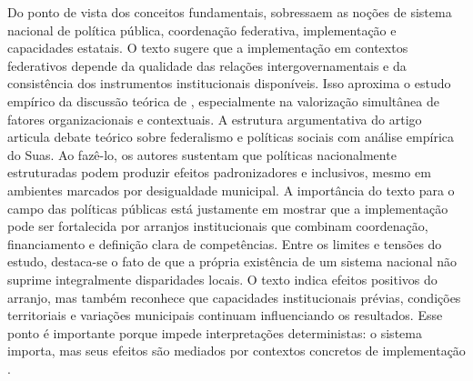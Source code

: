 \documentclass[12pt,a4paper]{article}
\begin{document}
Do ponto de vista dos conceitos fundamentais, sobressaem as noções de sistema nacional de política pública, coordenação federativa, implementação e capacidades estatais. O texto sugere que a implementação em contextos federativos depende da qualidade das relações intergovernamentais e da consistência dos instrumentos institucionais disponíveis. Isso aproxima o estudo empírico da discussão teórica de \textcite{dascenzi2013_implementacao_de}, especialmente na valorização simultânea de fatores organizacionais e contextuais.
A estrutura argumentativa do artigo articula debate teórico sobre federalismo e políticas sociais com análise empírica do Suas. Ao fazê-lo, os autores sustentam que políticas nacionalmente estruturadas podem produzir efeitos padronizadores e inclusivos, mesmo em ambientes marcados por desigualdade municipal. A importância do texto para o campo das políticas públicas está justamente em mostrar que a implementação pode ser fortalecida por arranjos institucionais que combinam coordenação, financiamento e definição clara de competências.
Entre os limites e tensões do estudo, destaca-se o fato de que a própria existência de um sistema nacional não suprime integralmente disparidades locais. O texto indica efeitos positivos do arranjo, mas também reconhece que capacidades institucionais prévias, condições territoriais e variações municipais continuam influenciando os resultados. Esse ponto é importante porque impede interpretações deterministas: o sistema importa, mas seus efeitos são mediados por contextos concretos de implementação \autocite{bichir2020_sistemas_nacionais}.
\end{document}

